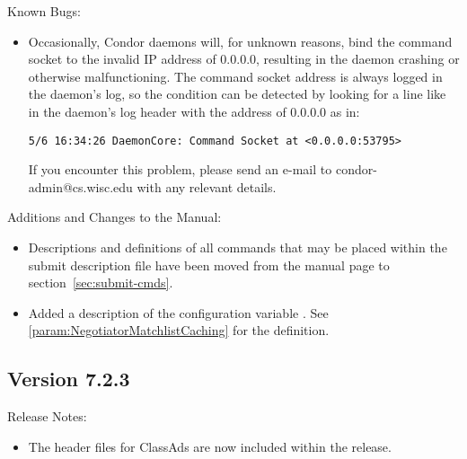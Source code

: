 \noindent Known Bugs:

\begin{itemize}

\item Occasionally, Condor daemons will, for unknown reasons, bind the
  command socket to the invalid IP address of 0.0.0.0, resulting in
  the daemon crashing or otherwise malfunctioning.  The command socket
  address is always logged in the daemon's log, so the condition can
  be detected by looking for a line like in the daemon's log header
  with the address of 0.0.0.0 as in:
\begin{verbatim}
5/6 16:34:26 DaemonCore: Command Socket at <0.0.0.0:53795>
\end{verbatim}
  If you encounter this problem, please send an e-mail to
  condor-admin@cs.wisc.edu with any relevant details.

\end{itemize}

\noindent Additions and Changes to the Manual:

\begin{itemize}

\item Descriptions and definitions of all commands that may be placed within
  the submit description file have been moved from the  
  manual page to section~\ref{sec:submit-cmds}.

\item Added a description of the configuration variable
  .
  See \ref{param:NegotiatorMatchlistCaching} for the definition.

\end{itemize}


\subsection*{\label{sec:New-7-2-3}Version 7.2.3}

\noindent Release Notes:

\begin{itemize}

\item The header files for ClassAds are now included within the release.

\end{itemize}

